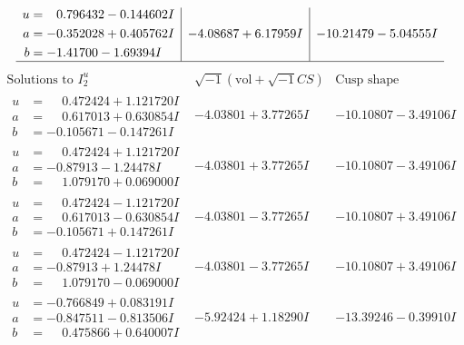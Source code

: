 \documentclass[1p]{elsarticle_modified}
\theoremstyle{definition}
\newcommand{\I}{\sqrt{-1}}
\begin{document}
$$\begin{array}{c|c|c}
\begin{aligned}
u &= \phantom{-}0.796432 - 0.144602 I \\
a &= -0.352028 + 0.405762 I \\
b &= -1.41700 - 1.69394 I\end{aligned}
 & -4.08687 + 6.17959 I & -10.21479 - 5.04555 I\\
 \hline 
 \end{array}$$\newpage$$\begin{array}{c|c|c}  
\text{Solutions to }I^u_{2}& \I (\text{vol} + \sqrt{-1}CS) & \text{Cusp shape}\\
 \hline 
\begin{aligned}
u &= \phantom{-}0.472424 + 1.121720 I \\
a &= \phantom{-}0.617013 + 0.630854 I \\
b &= -0.105671 - 0.147261 I\end{aligned}
 & -4.03801 + 3.77265 I & -10.10807 - 3.49106 I \\ \hline\begin{aligned}
u &= \phantom{-}0.472424 + 1.121720 I \\
a &= -0.87913 - 1.24478 I \\
b &= \phantom{-}1.079170 + 0.069000 I\end{aligned}
 & -4.03801 + 3.77265 I & -10.10807 - 3.49106 I \\ \hline\begin{aligned}
u &= \phantom{-}0.472424 - 1.121720 I \\
a &= \phantom{-}0.617013 - 0.630854 I \\
b &= -0.105671 + 0.147261 I\end{aligned}
 & -4.03801 - 3.77265 I & -10.10807 + 3.49106 I \\ \hline\begin{aligned}
u &= \phantom{-}0.472424 - 1.121720 I \\
a &= -0.87913 + 1.24478 I \\
b &= \phantom{-}1.079170 - 0.069000 I\end{aligned}
 & -4.03801 - 3.77265 I & -10.10807 + 3.49106 I \\ \hline\begin{aligned}
u &= -0.766849 + 0.083191 I \\
a &= -0.847511 - 0.813506 I \\
b &= \phantom{-}0.475866 + 0.640007 I\end{aligned}
 & -5.92424 + 1.18290 I & -13.39246 - 0.39910 I \\ \hline\begin{aligned}

\end{aligned}
\end{array}$$
\end{document}
